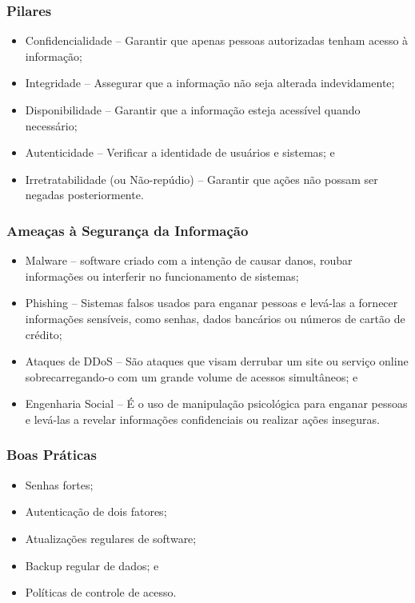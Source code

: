 \documentclass[aspectratio=169]{beamer} %
\begin{document}
\begin{frame}
	\frametitle{Pilares}

	\begin{itemize}
		\item Confidencialidade -- Garantir que apenas pessoas autorizadas tenham acesso à informação;
		\item Integridade -- Assegurar que a informação não seja alterada indevidamente;
		\item Disponibilidade -- Garantir que a informação esteja acessível quando necessário;
		\item Autenticidade -- Verificar a identidade de usuários e sistemas; e
		\item Irretratabilidade (ou Não-repúdio) -- Garantir que ações não possam ser negadas posteriormente.
	\end{itemize}
\end{frame}

\begin{frame}
	\frametitle{Ameaças à Segurança da Informação}
	
	\begin{itemize}
		\item Malware -- software criado com a intenção de causar danos, roubar informações ou interferir no funcionamento de sistemas;
		\item Phishing -- Sistemas falsos usados para enganar pessoas e levá-las a fornecer informações sensíveis, como senhas, dados bancários ou números de cartão de crédito;
		\item Ataques de DDoS -- São ataques que visam derrubar um site ou serviço online sobrecarregando-o com um grande volume de acessos simultâneos; e
		\item Engenharia Social -- É o uso de manipulação psicológica para enganar pessoas e levá-las a revelar informações confidenciais ou realizar ações inseguras.
	\end{itemize}
\end{frame}

\begin{frame}
	\frametitle{Boas Práticas}
	
	\begin{itemize}
		\item Senhas fortes;
		\item Autenticação de dois fatores;
		\item Atualizações regulares de software;
		\item Backup regular de dados; e
		\item Políticas de controle de acesso.
	\end{itemize}
\end{frame}
\end{document}
